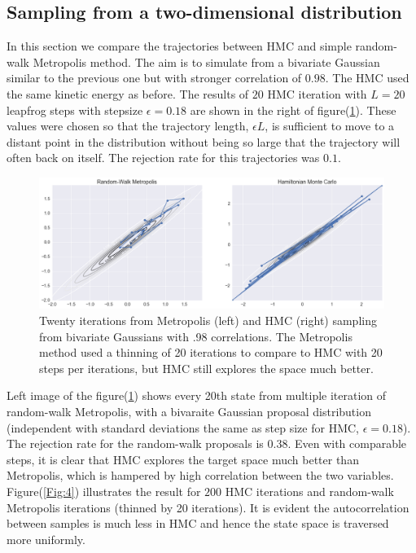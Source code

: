 \documentclass{article}
\numberwithin{equation}{section}
\begin{document}
\subsection{Sampling from a two-dimensional distribution}
In this section we compare the trajectories between HMC and simple random-walk Metropolis method. The aim is to simulate from a bivariate Gaussian similar to the previous one but with stronger correlation of $0.98$. The HMC used the same kinetic energy as before. The results of $20$ HMC iteration with $L=20$ leapfrog steps with stepsize $\epsilon = 0.18$ are shown in the right of figure(\ref{Fig:3}). These values were chosen so that the trajectory length, $\epsilon L$, is sufficient to move to a distant point in the distribution without being so large that the trajectory will often back on itself. The rejection rate for this trajectories was $0.1$.
\begin{figure}[H]
\centering
  \includegraphics[width=1\linewidth]{MH_HMC_double_position.png}
  \caption{Twenty iterations from Metropolis (left) and HMC (right) sampling from bivariate Gaussians with .98 correlations.  The Metropolis method used a thinning of 20 iterations to compare to HMC with 20 steps per iterations, but HMC still explores the space much better.}
\label{Fig:3}
\end{figure}



Left image of the figure(\ref{Fig:3}) shows every 20th state from multiple iteration of random-walk Metropolis, with a bivaraite Gaussian proposal distribution (independent with standard deviations the same as step size for HMC, $\epsilon = 0.18$). The rejection rate for the random-walk proposals is $0.38$. Even with comparable steps, it is clear that HMC explores the target space much better than Metropolis, which is hampered by high correlation between the two variables.\\

Figure(\ref{Fig:4}) illustrates the result for $200$ HMC iterations and random-walk Metropolis iterations (thinned by 20 iterations). It is evident the autocorrelation between samples is much less in HMC and hence the state space is traversed more uniformly.
\end{document}
